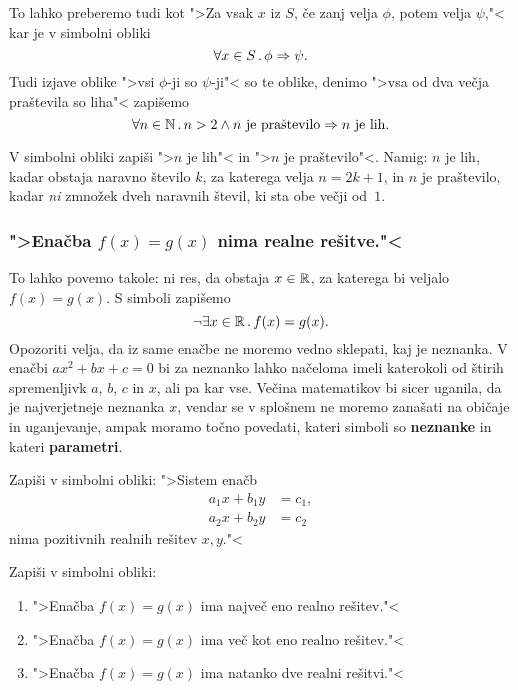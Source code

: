 To lahko preberemo tudi kot ">Za vsak $x$ iz $S$, če zanj velja $\phi$,
potem velja $\psi$,"< kar je v simbolni obliki
%
\begin{equation*}
  \forall x \in S \,.\, \phi \Rightarrow \psi.
\end{equation*}
%
Tudi izjave oblike ">vsi $\phi$-ji so $\psi$-ji"< so te oblike, denimo ">vsa
od dva večja praštevila so liha"< zapišemo
%
\begin{equation*}
  \forall n \in \mathbb{N} \,.\, n > 2 \land \text{$n$ je praštevilo} \Rightarrow \text{$n$ je lih}.
\end{equation*}

\begin{vaja}
  V simbolni obliki zapiši ">$n$ je lih"< in ">$n$ je praštevilo"<.
  Namig: $n$ je lih, kadar obstaja naravno število $k$, za katerega
  velja $n = 2 k + 1$, in $n$ je praštevilo, kadar \emph{ni} zmnožek
  dveh naravnih števil, ki sta obe večji od~$1$.
\end{vaja}


\subsubsection{">Enačba $f(x) = g(x)$ nima realne rešitve."<}

To lahko povemo takole: ni res, da obstaja $x \in \mathbb{R}$, za katerega bi
veljalo $f(x) = g(x)$. S simboli zapišemo
%
\begin{equation*}
  \lnot \exists x \in \mathbb{R} \,.\, f(x) = g(x).
\end{equation*}
%
Opozoriti velja, da iz same enačbe ne moremo vedno sklepati, kaj je
neznanka. V enačbi $a x^2 + b x + c = 0$ bi za neznanko lahko načeloma
imeli katerokoli od štirih spremenljivk $a$, $b$, $c$ in $x$, ali pa
kar vse. Večina matematikov bi sicer uganila, da je najverjetneje
neznanka $x$, vendar se v splošnem ne moremo zanašati na običaje in
uganjevanje, ampak moramo točno povedati, kateri simboli so
\textbf{neznanke} in kateri \textbf{parametri}.

\begin{vaja}
  Zapiši v simbolni obliki: ">Sistem enačb
  \begin{align*}
    a_1 x + b_1 y &= c_1,\\
    a_2 x + b_2 y &= c_2
  \end{align*}
  nima pozitivnih realnih rešitev $x, y$."<
\end{vaja}

\begin{vaja}
  Zapiši v simbolni obliki:
  \begin{enumerate}
  \item ">Enačba $f(x) = g(x)$ ima največ eno realno rešitev."<
  \item ">Enačba $f(x) = g(x)$ ima več kot eno realno rešitev."<
  \item ">Enačba $f(x) = g(x)$ ima natanko dve realni rešitvi."<
  \end{enumerate}
\end{vaja}


